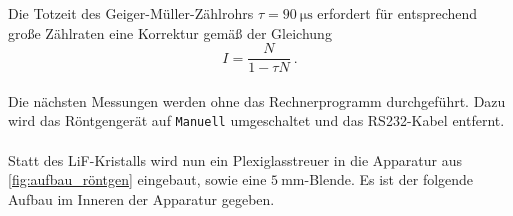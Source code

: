     Die Totzeit des Geiger-Müller-Zählrohrs $\tau = \SI{90}{\micro\second}$
    erfordert für entsprechend große Zählraten eine Korrektur gemäß der Gleichung
    \begin{equation}
        I = \frac{N}{1 - \tau N} \ .
        \label{eqn:totzeitkorrektur}
    \end{equation}
    \\
    Die nächsten Messungen werden ohne das Rechnerprogramm durchgeführt.
    Dazu wird das Röntgengerät auf \texttt{Manuell} umgeschaltet und das RS232-Kabel entfernt.\\
    \\
    Statt des LiF-Kristalls wird nun ein Plexiglasstreuer in die Apparatur aus \autoref{fig:aufbau_röntgen} eingebaut,
    sowie eine $\SI{5}{\milli\meter}$-Blende.
    Es ist der folgende Aufbau im Inneren der Apparatur gegeben.

